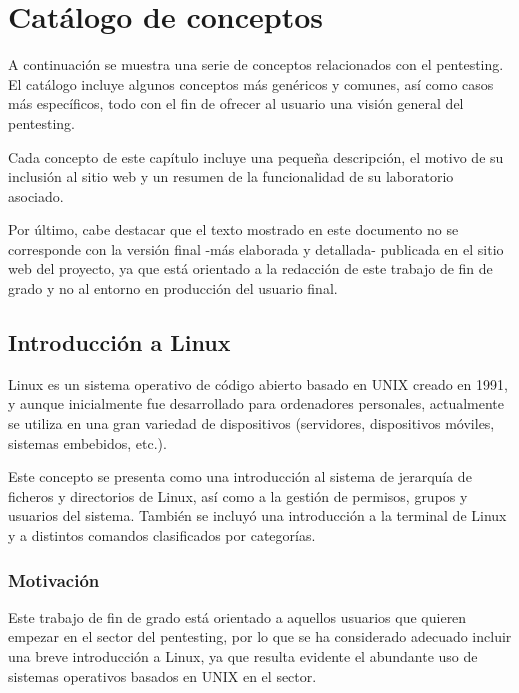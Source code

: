             \newpage
        
        
\chapter{Catálogo de conceptos}
    \label{cap:catalogo}

    A continuación se muestra una serie de conceptos relacionados con el pentesting. El catálogo incluye algunos conceptos más genéricos y comunes, así como casos más específicos, todo con el fin de ofrecer al usuario una visión general del pentesting.

    Cada concepto de este capítulo incluye una pequeña descripción, el motivo de su inclusión al sitio web y un resumen de la funcionalidad de su laboratorio asociado.

    Por último, cabe destacar que el texto mostrado en este documento no se corresponde con la versión final -más elaborada y detallada- publicada en el sitio web del proyecto, ya que está orientado a la redacción de este trabajo de fin de grado y no al entorno en producción del usuario final.


    \section{Introducción a Linux}

        Linux es un sistema operativo de código abierto basado en UNIX creado en 1991, y aunque inicialmente fue desarrollado para ordenadores personales, actualmente se utiliza en una gran variedad de dispositivos (servidores, dispositivos móviles, sistemas embebidos, etc.).

        Este concepto se presenta como una introducción al sistema de jerarquía de ficheros y directorios de Linux, así como a la gestión de permisos, grupos y usuarios del sistema. También se incluyó una introducción a la terminal de Linux y a distintos comandos clasificados por categorías.

        \subsection{Motivación}

            Este trabajo de fin de grado está orientado a aquellos usuarios que quieren empezar en el sector del pentesting, por lo que se ha considerado adecuado incluir una breve introducción a Linux, ya que resulta evidente el abundante uso de sistemas operativos basados en UNIX en el sector.

